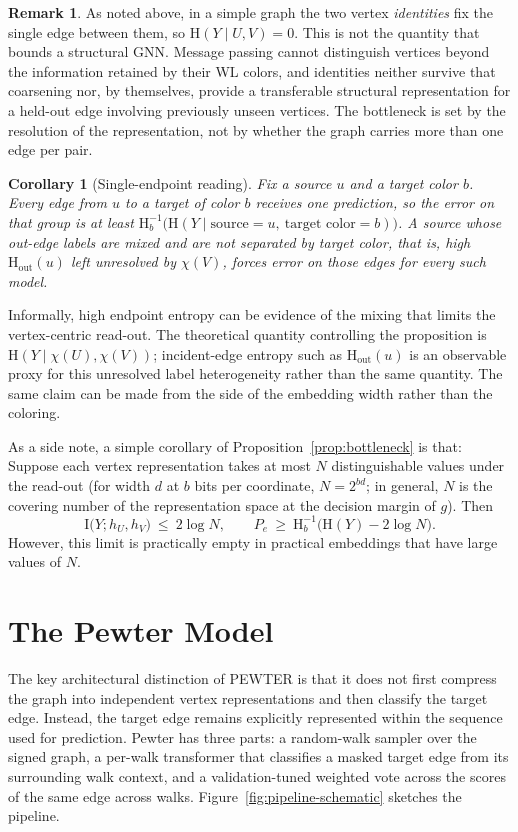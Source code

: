 \documentclass[sigconf]{acmart}
\newcommand{\Hh}{\mathrm{H}}
\newcommand{\MI}{\mathrm{I}}
\newcommand{\outdeg}{\mathrm{out}}
\theoremstyle{plain}
\newtheorem{corollary}{Corollary}
\theoremstyle{definition}
\newtheorem{remark}{Remark}
\begin{document}
\begin{remark}
As noted above, in a simple graph the two vertex \emph{identities} fix the single edge between them, so $\Hh(Y\mid U,V)=0$. This is not the quantity that bounds a structural GNN. Message passing cannot distinguish vertices beyond the information retained by their WL colors, and identities neither survive that coarsening nor, by themselves, provide a transferable structural representation for a held-out edge involving previously unseen vertices. The bottleneck is set by the resolution of the representation, not by whether the graph carries more than one edge per pair.\end{remark}

\begin{corollary}[Single-endpoint reading]
\label{cor:endpoint}
Fix a source $u$ and a target color $b$. Every edge from $u$ to a target of color $b$ receives one prediction, so the error on that group is at least $\Hh_b^{-1}\big(\Hh(Y\mid \text{source}{=}u,\ \text{target color}{=}b)\big)$. A source whose out-edge labels are mixed and are not separated by target color, that is, high $\Hh_\outdeg(u)$ left unresolved by $\chi(V)$, forces error on those edges for every such model.
\end{corollary}

Informally, high endpoint entropy can be evidence of the mixing that limits the vertex-centric read-out. The theoretical quantity controlling the proposition is $\Hh(Y\mid\chi(U),\chi(V))$; incident-edge entropy such as $\Hh_\outdeg(u)$ is an observable proxy for this unresolved label heterogeneity rather than the same quantity. The same claim can be made from the side of the embedding width rather than the coloring. 

As a side note, a simple corollary of Proposition~\ref{prop:bottleneck} is that: Suppose each vertex representation takes at most $N$ distinguishable values under the read-out (for width $d$ at $b$ bits per coordinate, $N=2^{bd}$; in general, $N$ is the covering number of the representation space at the decision margin of $g$). Then
\begin{equation}
\MI\big(Y;h_U,h_V\big)\ \le\ 2\log N, \qquad P_e\ \ge\ \Hh_b^{-1}\big(\Hh(Y)-2\log N\big).
\end{equation}
However, this limit is practically empty in practical embeddings that have large values of $N$.
\section{The Pewter Model}
\label{sec:methods}
The key architectural distinction of PEWTER is that it does not first compress the graph into independent vertex representations and then classify the target edge. Instead, the target edge remains explicitly represented within the sequence used for prediction. Pewter has three parts: a random-walk sampler over the signed graph, a per-walk transformer that classifies a masked target edge from its surrounding walk context, and a validation-tuned weighted vote across the scores of the same edge across walks. Figure~\ref{fig:pipeline-schematic} sketches the pipeline.
\end{document}

